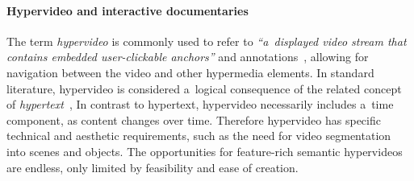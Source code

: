 \documentclass[conference]{IEEEtran}
\newcommand{\todo}[1]{\noindent\textcolor{red}{{\bf \{ToDo} #1{\bf \}}}}
\begin{document}


\paragraph*{Hypervideo and interactive documentaries}

The term \emph{hypervideo} is commonly used to refer to
\textit{``a~displayed video stream that contains embedded user-clickable anchors''}
and annotations~\cite{sawhney1996hypercafe}, %
allowing for navigation between the video and other hypermedia elements.
In standard literature, hypervideo is considered a~logical consequence
of the related concept of \emph{hypertext}~\cite{bernerslee1990hypertext},
In contrast to hypertext, hypervideo necessarily includes a~time component,
as content changes over time. Therefore hypervideo has specific technical and aesthetic requirements, 
such as the need for video segmentation into scenes and  objects. The opportunities for feature-rich 
semantic hypervideos are endless, only limited by feasibility and ease of creation. 
\end{document}
